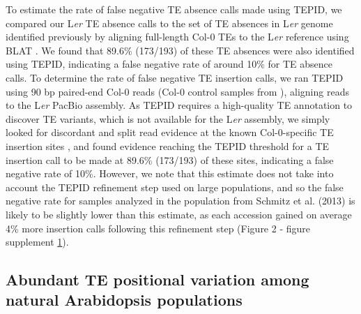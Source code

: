 \documentclass[12pt]{article}
\begin{document}
To estimate the rate of false negative TE absence calls made using
TEPID, we compared our L\emph{er} TE absence calls to the set of TE
absences in L\emph{er} genome identified previously by aligning
full-length Col-0 TEs to the L\emph{er} reference using BLAT
\cite{Quadrana:2016bi}. We found that 89.6\% (173/193) of these TE
absences were also identified using TEPID, indicating a false negative
rate of around 10\% for TE absence calls. To determine the rate of false
negative TE insertion calls, we ran TEPID using 90 bp paired-end Col-0
reads (Col-0 control samples from \cite{Jiang:2014ih}), aligning reads
to the L\emph{er} PacBio assembly. As TEPID requires a high-quality TE
annotation to discover TE variants, which is not available for the
L\emph{er} assembly, we simply looked for discordant and split read
evidence at the known Col-0-specific TE insertion sites
\cite{Quadrana:2016bi}, and found evidence reaching the TEPID threshold
for a TE insertion call to be made at 89.6\% (173/193) of these sites,
indicating a false negative rate of 10\%. However, we note that this
estimate does not take into account the TEPID refinement step used on
large populations, and so the false negative rate for samples analyzed
in the population from Schmitz et al. (2013) is likely to be slightly
lower than this estimate, as each accession gained on average 4\% more
insertion calls following this refinement step (Figure 2 - figure
supplement \hyperref[fig2s1]{1}).

\subsection{Abundant TE positional variation among natural Arabidopsis
populations}
\end{document}
